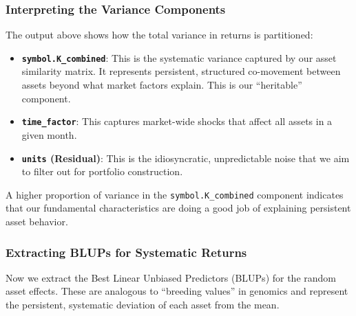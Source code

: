 \documentclass[
]{article}
\providecommand{\tightlist}{%
  \setlength{\itemsep}{0pt}\setlength{\parskip}{0pt}}
\begin{document}
\subsubsection{Interpreting the Variance
Components}\label{interpreting-the-variance-components}

The output above shows how the total variance in returns is partitioned:

\begin{itemize}
\tightlist
\item
  \textbf{\texttt{symbol.K\_combined}}: This is the systematic variance
  captured by our asset similarity matrix. It represents persistent,
  structured co-movement between assets beyond what market factors
  explain. This is our ``heritable'' component.
\item
  \textbf{\texttt{time\_factor}}: This captures market-wide shocks that
  affect all assets in a given month.
\item
  \textbf{\texttt{units} (Residual)}: This is the idiosyncratic,
  unpredictable noise that we aim to filter out for portfolio
  construction.
\end{itemize}

A higher proportion of variance in the \texttt{symbol.K\_combined}
component indicates that our fundamental characteristics are doing a
good job of explaining persistent asset behavior.

\subsubsection{Extracting BLUPs for Systematic
Returns}\label{extracting-blups-for-systematic-returns}

Now we extract the Best Linear Unbiased Predictors (BLUPs) for the
random asset effects. These are analogous to ``breeding values'' in
genomics and represent the persistent, systematic deviation of each
asset from the mean.
\end{document}
